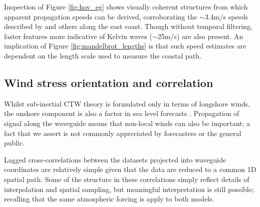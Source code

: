 Inspection of Figure \ref{fig:hov_eg} shows visually coherent structures from which apparent propagation speeds can be derived, corroborating the $\sim$3.4m/s speeds described by \citet{Woodham:2013cl} and others along the east coast.
Though without temporal filtering, faster features more indicative of Kelvin waves ($\sim$25m/s) are also present.   
An implication of Figure \ref{fig:mandelbrot_lengths} is that such speed estimates are dependent on the length scale used to measure the coastal path. 

\subsection{Wind stress orientation and correlation}
Whilst sub-inertial CTW theory is formulated only in terms of longshore winds, the onshore component is also a factor in sea level forecasts \citep{Tilburg:2004cg}.
Propagation of signal along the waveguide means that non-local winds can also be important; a fact that we assert is not commonly appreciated by forecasters or the general public. 


Lagged cross-correlations between the datasets projected into waveguide coordinates are relatively simple given that the data are reduced to a common 1D spatial path. 
Some of the structure in these correlations simply reflect details of interpolation and spatial sampling, but meaningful interpretation is still possible; recalling that the same atmospheric forcing is apply to both models.


